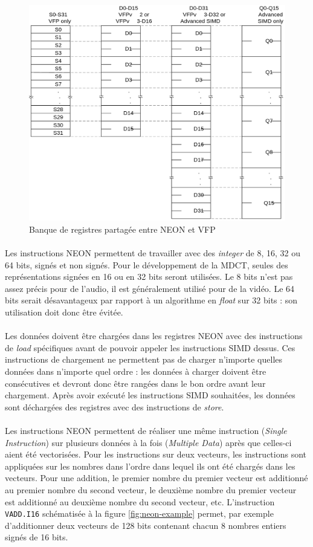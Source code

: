 \documentclass{article}
\begin{document}
    \begin{figure}[H]
        \centering
        \includegraphics[width=.6\linewidth]{./images/neon-registers.png}
        \caption{Banque de registres partagée entre NEON et VFP}
        \label{fig:neon-registers}
    \end{figure}

    \paragraph{}
    Les instructions NEON permettent de travailler avec des \emph{integer} de 8, 16, 32 ou 64 bits, signés et non signés. Pour le développement de la MDCT, seules des représentations signées en 16 ou en 32 bits seront utilisées. Le 8 bits n'est pas assez précis pour de l'audio, il est généralement utilisé pour de la vidéo. Le 64 bits serait désavantageux par rapport à un algorithme en \emph{float} sur 32 bits : son utilisation doit donc être évitée.

    \paragraph{}
    Les données doivent être chargées dans les registres NEON avec des instructions de \emph{load} spécifiques avant de pouvoir appeler les instructions SIMD dessus. Ces instructions de chargement ne permettent pas de charger n'importe quelles données dans n'importe quel ordre : les données à charger doivent être consécutives et devront donc être rangées dans le bon ordre avant leur chargement. Après avoir exécuté les instructions SIMD souhaitées, les données sont déchargées des registres avec des instructions de \emph{store}.

    \paragraph{}
    Les instructions NEON permettent de réaliser une même instruction (\emph{Single Instruction}) sur plusieurs données à la fois (\emph{Multiple Data}) après que celles-ci aient été vectorisées. Pour les instructions sur deux vecteurs, les instructions sont appliquées sur les nombres dans l'ordre dans lequel ils ont été chargés dans les vecteurs. Pour une addition, le premier nombre du premier vecteur est additionné au premier nombre du second vecteur, le deuxième nombre du premier vecteur est additionné au deuxième nombre du second vecteur, etc. L'instruction \texttt{VADD.I16} schématisée à la figure \ref{fig:neon-example} permet, par exemple d'additionner deux vecteurs de 128 bits contenant chacun 8 nombres entiers signés de 16 bits.
\end{document}
